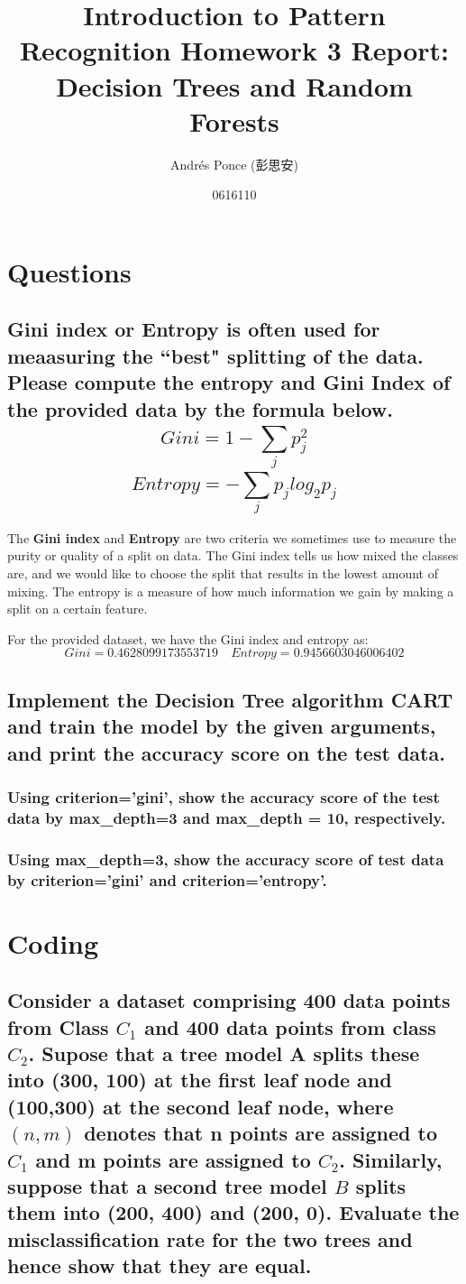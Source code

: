 \documentclass{article}
\title{Introduction to Pattern Recognition Homework 3 Report:
Decision Trees and Random Forests}
\author{Andr\'es Ponce (彭思安)\\
\and
0616110}
\begin{document}
\maketitle


\section{Questions}
	\subsection{Gini index or Entropy is often used for meaasuring the ``best" splitting of the 
		data. Please compute the entropy and Gini Index of the provided data by the formula below.
			\[ Gini = 1 - \sum_{j}^{}p^{2}_{j}\]
			\[ Entropy = -\sum_{j}^{}p_{j}log_{2}p_{j}\]
		}
	The \textbf{Gini index} and \textbf{Entropy} are two criteria we sometimes use to measure the 
	purity or quality of a split on data. The Gini index tells us how mixed the classes are, and 
	we would like to choose the split that results in the lowest amount of mixing. The entropy is
	a measure of how much information we gain by making a split on a certain feature.

	For the provided dataset, we have the Gini index and entropy as:
	\[ Gini = 0.4628099173553719 \quad Entropy = 0.9456603046006402\]

	\subsection{Implement the Decision Tree algorithm CART and train the model by the given arguments,
				and print the accuracy score on the test data.}

		\subsubsection{Using criterion='gini', show the accuracy score of the test data by 
				max\_depth=3 and max\_depth = 10, respectively.}

		\subsubsection{Using max\_depth=3, show the accuracy score of test data by criterion='gini' 
						and criterion='entropy'.}
\section{Coding}
	\subsection{Consider a dataset comprising 400 data points from Class $C_{1}$ and 400 data points 
		from class $C_{2}$. Supose that a tree model A splits these into (300, 100) at the first leaf
		node and (100,300) at the second leaf node, where $(n,m)$ denotes that n points are assigned 
		to $C_{1}$ and m points are assigned to $C_{2}$. Similarly, suppose that a second tree model $B$
		splits them into (200, 400) and (200, 0). Evaluate the misclassification rate for the two trees
		and hence show that they are equal.}
\end{document}
